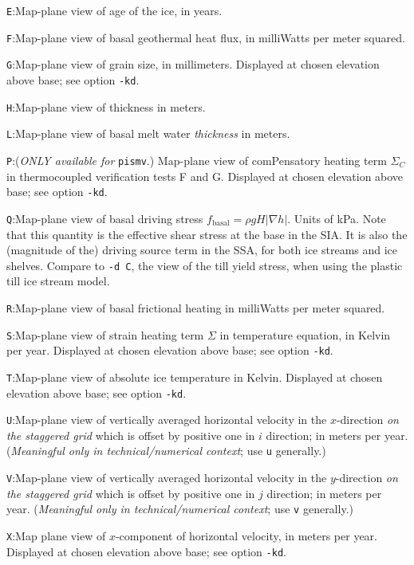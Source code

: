 \documentclass[11pt,final]{amsart}
\renewcommand{\t}[1]{\texttt{#1}}
\newcommand{\grad}{\nabla}
\begin{document}
\verb|E|:\quad Map-plane view of age of the ice, in years.

\verb|F|:\quad Map-plane view of basal geothermal heat flux, in milliWatts per meter squared.

\verb|G|:\quad Map-plane view of grain size, in millimeters.  Displayed at chosen elevation above base; see option \verb|-kd|.

\verb|H|:\quad Map-plane view of thickness in meters.

\verb|L|:\quad Map-plane view of basal melt water \emph{thickness} in meters.

\verb|P|:\quad \notMat (\emph{ONLY available for }\t{pismv}.)  Map-plane view of comPensatory heating term $\Sigma_C$ in thermocoupled verification tests F and G.  Displayed at chosen elevation above base; see option \verb|-kd|.

\verb|Q|:\quad Map-plane view of basal driving stress $f_{\text{basal}} = \rho g H |\grad h|$.  Units of kPa.  Note that this quantity is the effective shear stress at the base in the SIA.  It is also the (magnitude of the) driving source term in the SSA, for both ice streams and ice shelves.  Compare to \verb|-d C|, the view of the till yield stress, when using the plastic till ice stream model.

\verb|R|:\quad Map-plane view of basal frictional heating in milliWatts per meter squared.

\verb|S|:\quad Map-plane view of strain heating term $\Sigma$ in temperature equation, in Kelvin per year.  Displayed at chosen elevation above base; see option \verb|-kd|.

\verb|T|:\quad Map-plane view of absolute ice temperature in Kelvin.  Displayed at chosen elevation above base; see option \verb|-kd|.

\verb|U|:\quad Map-plane view of vertically averaged horizontal velocity in the $x$-direction \emph{on the staggered grid} which is offset by positive one in $i$ direction;  in meters per year.  (\emph{Meaningful only in technical/numerical context}; use \verb|u| generally.)

\verb|V|:\quad Map-plane view of vertically averaged horizontal velocity in the $y$-direction \emph{on the staggered grid} which is offset by positive one in $j$ direction;  in meters per year.  (\emph{Meaningful only in technical/numerical context}; use \verb|v| generally.)

\verb|X|:\quad Map plane view of $x$-component of horizontal velocity, in meters per year.  Displayed at chosen elevation above base; see option \verb|-kd|.
\end{document}
